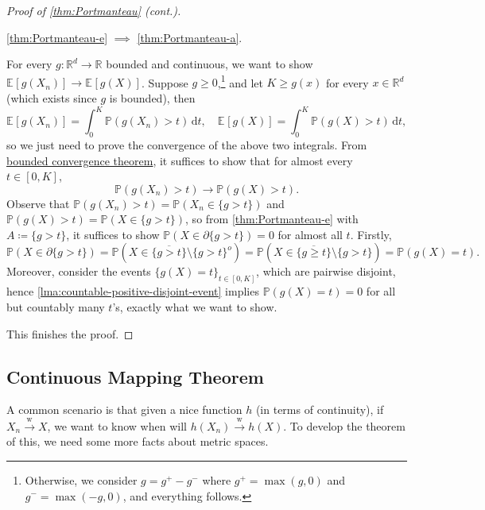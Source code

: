 \begin{proof}[Proof of \autoref{thm:Portmanteau} (cont.)]
	\begin{claim}
		\autoref{thm:Portmanteau-e} \(\implies \) \autoref{thm:Portmanteau-a}.
	\end{claim}
	\begin{explanation}
		For every \(g \colon \mathbb{R} ^d \to \mathbb{R} \) bounded and continuous, we want to show \(\mathbb{E}_{}\left[g(X_n) \right] \to \mathbb{E}_{}\left[g(X) \right] \). Suppose \(g \geq 0\),\footnote{Otherwise, we consider \(g = g^+ - g^-\) where \(g^+ = \max (g, 0)\) and \(g^- = \max (-g, 0)\), and everything follows.} and let \(K \geq g(x)\) for every \(x \in \mathbb{R} ^d\) (which exists since \(g\) is bounded), then
		\[
			\mathbb{E}_{}\left[g(X_n) \right]
			= \int_{0}^{K} \mathbb{P} (g(X_n) > t) \,\mathrm{d}t , \quad
			\mathbb{E}_{}\left[g(X) \right]
			= \int_{0}^{K} \mathbb{P} (g(X) > t) \,\mathrm{d}t,
		\]
		so we just need to prove the convergence of the above two integrals. From \href{https://en.wikipedia.org/wiki/Dominated_convergence_theorem}{bounded convergence theorem}, it suffices to show that for almost every \(t \in [0, K]\),
		\[
			\mathbb{P} (g(X_n) > t) \to \mathbb{P} (g(X) > t).
		\]
		Observe that \(\mathbb{P} (g(X_n) > t) = \mathbb{P} (X_n \in \{ g > t \} )\) and \(\mathbb{P} (g(X) > t) = \mathbb{P} (X \in \{ g > t \} )\), so from \autoref{thm:Portmanteau-e} with \(A\coloneqq \{ g > t \} \), it suffices to show \(\mathbb{P} (X \in \partial \{ g > t \} ) = 0\) for almost all \(t\). Firstly,
		\[
			\mathbb{P} (X \in \partial \{ g > t \} )
			= \mathbb{P} (X \in \overline{\{ g > t \} } \setminus \{ g > t \}^o )
			= \mathbb{P} (X \in \overline{\{ g \geq t \} } \setminus \{ g > t \} )
			= \mathbb{P} (g(X) = t ).
		\]
		Moreover, consider the events \(\{ g(X) = t \} _{t \in [0, K]}\), which are pairwise disjoint, hence \autoref{lma:countable-positive-disjoint-event} implies \(\mathbb{P} (g(X) = t) = 0\) for all but countably many \(t\)'s, exactly what we want to show.
	\end{explanation}
	This finishes the proof.
\end{proof}

\subsection{Continuous Mapping Theorem}
A common scenario is that given a nice function \(h\) (in terms of continuity), if \(X_n \overset{\text{w} }{\to } X\), we want to know when will \(h(X_n) \overset{\text{w} }{\to } h(X)\). To develop the theorem of this, we need some more facts about metric spaces.

